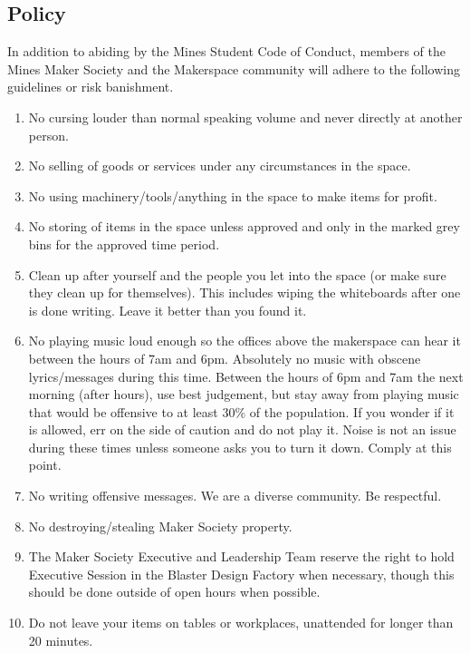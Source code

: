 \documentclass[12pt,letterpaper]{article}
\begin{document}
\subsection{Policy}

In addition to abiding by the Mines Student Code of Conduct, members of the Mines Maker Society and the Makerspace community will adhere to the following guidelines or risk banishment.  

\begin{enumerate}
    \item No cursing louder than normal speaking volume and never directly at another person.  
    \item No selling of goods or services under any circumstances in the space.  
    \item No using machinery/tools/anything in the space to make items for profit.  
    \item No storing of items in the space unless approved and only in the marked grey bins for the approved time period.  
    \item Clean up after yourself and the people you let into the space (or make sure they clean up for themselves). This includes wiping the whiteboards after one is done writing. Leave it better than you found it. 
    \item No playing music loud enough so the offices above the makerspace can hear it between the hours of 7am and 6pm. Absolutely no music with obscene lyrics/messages during this time. Between the hours of 6pm and 7am the next morning (after hours), use best judgement, but stay away from playing music that would be offensive to at least 30\% of the population. If you wonder if it is allowed, err on the side of caution and do not play it. Noise is not an issue during these times unless someone asks you to turn it down. Comply at this point.  
    \item No writing offensive messages. We are a diverse community. Be respectful. 
    \item No destroying/stealing Maker Society property.  
    \item The Maker Society Executive and Leadership Team reserve the right to hold Executive Session in the Blaster Design Factory when necessary, though this should be done outside of open hours when possible. 
    \item Do not leave your items on tables or workplaces, unattended for longer than 20 minutes.
\end{enumerate}
\end{document}
